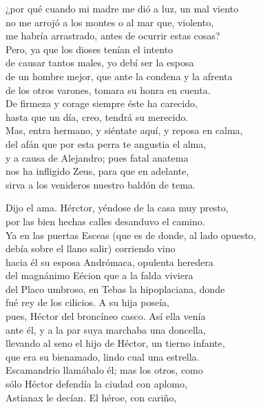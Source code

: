 ¿por qué cuando mi madre me dió a luz, un mal viento\\
no me arrojó a los montes o al mar que, violento,\\
me habría arrastrado, antes de ocurrir estas cosas?\\
Pero, ya que los dioses tenían el intento\\
de causar tantos males, yo debí ser la esposa\\
de un hombre mejor, que ante la condena y la afrenta\\
de los otros varones, tomara su honra en cuenta.\\
De firmeza y corage siempre éste ha carecido,\\
hasta que un día, creo, tendrá su merecido.\\
Mas, entra hermano, y siéntate aquí, y reposa en calma,\\
del afán que por esta perra te angustia el alma,\\
y a causa de Alejandro; pues fatal anatema\\
nos ha infligido Zeus, para que en adelante,\\
sirva a los venideros nuestro baldón de tema.\par
\poend
\separator
%
\postart
{}
Dijo el ama. Hérctor, yéndose de la casa muy presto,\\
por las bien hechas calles desanduvo el camino.\\
Ya en las puertas Esceas (que es de donde, al lado opuesto,\\
debía sobre el llano salir) corriendo vino\\
hacia él su esposa Andrómaca, opulenta heredera\\
del magnánimo Eécion que a la falda viviera\\
del Placo umbroso, en Tebas la hipoplaciana, donde\\
fué rey de los cilicios. A su hija poseía,\\
pues, Héctor del broncíneo casco. Así ella venía\\
ante él, y a la par suya marchaba una doncella,\\
llevando al seno el hijo de Héctor, un tierno infante,\\
que era su bienamado, lindo cual una estrella.\\
Escamandrio llamábalo él; mas los otros, como\\
sólo Héctor defendía la ciudad con aplomo,\\
Astianax le decían. El héroe, con cariño,\\
